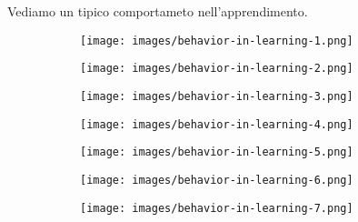 Vediamo un tipico comportameto nell'apprendimento.
\begin{figure}[h!]
    \centering
    \begin{subfigure}{0.32\textwidth}
        \centering
        \texttt{[image: images/behavior-in-learning-1.png]}
    \end{subfigure}
    \begin{subfigure}{0.32\textwidth}
        \centering
        \texttt{[image: images/behavior-in-learning-2.png]}
    \end{subfigure}
    \begin{subfigure}{0.32\textwidth}
        \centering
        \texttt{[image: images/behavior-in-learning-3.png]}
    \end{subfigure}
\end{figure}
\begin{figure}[h!]
    \centering
    \begin{subfigure}{0.4\textwidth}
        \centering
        \texttt{[image: images/behavior-in-learning-4.png]}
    \end{subfigure}
    \begin{subfigure}{0.4\textwidth}
        \centering
        \texttt{[image: images/behavior-in-learning-5.png]}
    \end{subfigure}
\end{figure}
\begin{figure}[h!]
    \centering
    \begin{subfigure}{0.4\textwidth}
        \centering
        \texttt{[image: images/behavior-in-learning-6.png]}
    \end{subfigure}
    \begin{subfigure}{0.4\textwidth}
        \centering
        \texttt{[image: images/behavior-in-learning-7.png]}
    \end{subfigure}
\end{figure}
